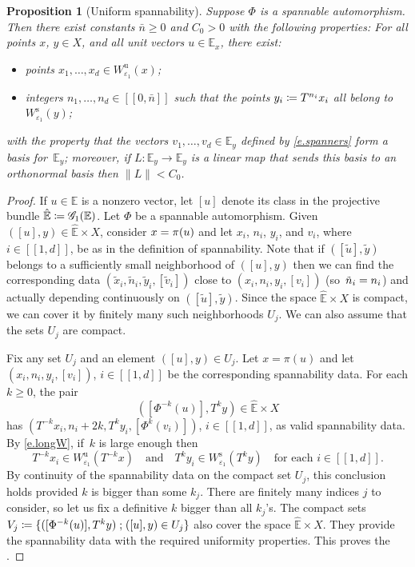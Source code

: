 \documentclass[10pt]{amsart}
\let\mathcal\mathscr
\newcommand{\ldbrack}{[\![}
\newcommand{\rdbrack}{]\!]}
\def\vcentcolon{\mathrel{\mathop\ordinarycolon}}
\providecommand\ordinarycolon{:}
\providecommand*\coloneqq{\vcentcolon\mathrel{\mkern-1.2mu}=}
\theoremstyle{plain}
\newtheorem{proposition}[theorem]{Proposition}
\theoremstyle{definition}
\newcommand{\EE}{\mathbb{E}}
\newcommand{\st}{\;\mathord{;}\;}
\newcommand{\uu}{\mathrm{u}}
\renewcommand{\ss}{\mathrm{s}}
\newcommand{\Gr}{\mathcal{G}}
\let\epsilon\varepsilon
\begin{document}
\begin{proposition}[Uniform spannability]\label{p.unif_span}
Suppose $\Phi$ is a spannable automorphism.
Then there exist constants $\bar{n} \ge 0$ and $C_0 > 0$ with the following properties:
For all points $x$, $y \in X$, and all unit vectors $u \in \EE_x$, there exist:
\begin{itemize}
	\item points $x_1, \dots, x_d \in W^\uu_{\epsilon_1}(x)$;
	\item integers $n_1, \dots, n_d \in \ldbrack 0, \bar{n} \rdbrack$ such that the points $y_i \coloneqq T^{n_i} x_i$ all belong to $W^\ss_{\epsilon_1}(y)$;
\end{itemize}
with the property that the vectors $v_1, \dots, v_d \in \EE_y$ defined by \eqref{e.spanners} form a basis for~$\EE_y$;
moreover, if $L \colon \EE_y \to \EE_y$ is a linear map that sends this basis to an orthonormal basis then $\|L\| < C_0$.
\end{proposition}

\begin{proof}
If $u \in \EE$ is a nonzero vector, let $[u]$ denote its class in the projective bundle $\hat{\EE} \coloneqq \Gr_1(\EE)$.
Let $\Phi$ be a spannable automorphism.
Given $([u], y) \in \hat{\EE} \times X$, consider $x =\nobreak \pi(u)$ and let $x_i$, $n_i$, $y_i$, and $v_i$, where $i \in \ldbrack 1,d \rdbrack$, be as in the definition of spannability.
Note that if $([\tilde u], \tilde y)$ belongs to a sufficiently small neighborhood of $([u],y)$ then we can find the corresponding data $(\tilde x_i, \tilde n_i, \tilde y_i, [\tilde v_i])$ close to $(x_i, n_i, y_i, [v_i])$ (so~$\tilde n_i =\nobreak n_i$) and actually depending continuously on $([\tilde u], \tilde y)$.
Since the space $\hat{\EE} \times X$ is compact, we can cover it by finitely many such neighborhoods $U_j$.
We can also assume that the sets $U_j$ are compact.

Fix any set $U_j$ and an element $([u],y) \in U_j$. Let $x = \pi(u)$ and let $(x_i, n_i, y_i, [v_i])$, $i \in \ldbrack 1,d \rdbrack$ be the corresponding spannability data.
For each $k \ge 0$, the pair
\[
([\Phi^{-k}(u)], T^k y) \in \hat{\EE} \times X
\]
has $(T^{-k} x_i, n_i+2k, T^k y_i, [\Phi^k(v_i)])$, $i \in \ldbrack 1,d \rdbrack$, as valid spannability data.
By \eqref{e.longW}, if~$k$ is large enough then
\[
T^{-k} x_i \in W^\uu_{\epsilon_1}(T^{-k} x) \quad\text{and}\quad T^k y_i \in W^\ss_{\epsilon_1}(T^k y) \quad \text{for each $i \in \ldbrack 1,d \rdbrack$.}
\]
By continuity of the spannability data on the compact set $U_j$, this conclusion holds provided $k$ is bigger than some $k_j$.
There are finitely many indices $j$ to consider, so let us fix a definitive $k$ bigger than all $k_j$'s.
The compact sets $V_j \coloneqq \{([\Phi^{-k}(u)], T^k y) \st ([u],y) \in U_j\}$ also cover the space $\hat{\EE} \times X$.
They provide the spannability data with the required uniformity properties.
This proves the .
\end{proof}
\end{document}
